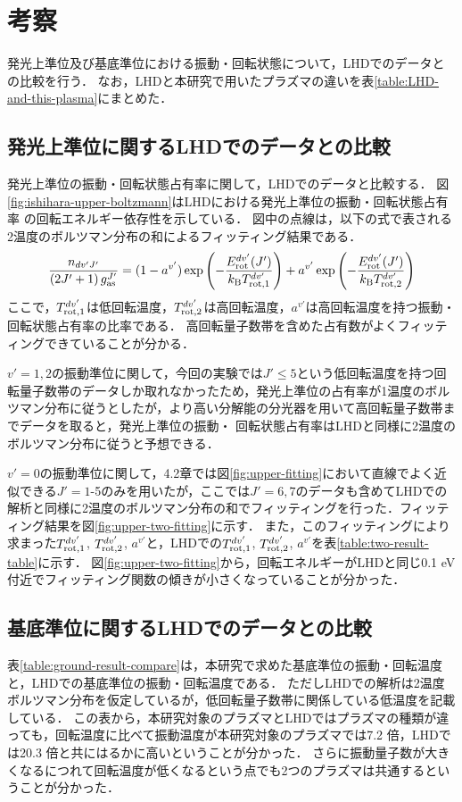 \chapter{考察}
発光上準位及び基底準位における振動・回転状態について，LHDでのデータとの比較を行う．
なお，LHDと本研究で用いたプラズマの違いを表\ref{table:LHD-and-this-plasma}にまとめた\cite{ishihara}．

\section{発光上準位に関するLHDでのデータとの比較}
発光上準位の振動・回転状態占有率に関して，LHDでのデータと比較する．
図\ref{fig:ishihara-upper-boltzmann}はLHDにおける発光上準位の振動・回転状態占有率
の回転エネルギー依存性を示している\cite{ishihara}．
図中の点線は，以下の式で表される2温度のボルツマン分布の和によるフィッティング結果である．
\begin{equation}
    \frac{n_{dv'J'}}{\left( 2J'+1 \right)g^{J'}_{\rm as}} = (1-a^{v'})\exp \left( - \frac{E^{dv'}_{\rm rot}(J')}{k_{\rm B} T^{dv'}_{\rm rot,1}} \right)+ a^{v'} \exp \left( - \frac{E^{dv'}_{\rm rot}(J')}{k_{\rm B} T^{dv'}_{\rm rot,2}} \right)
\end{equation}
ここで，$T^{dv'}_{\rm rot,1}$は低回転温度，$T^{dv'}_{\rm rot,2}$は高回転温度，$a^{v'}$は高回転温度を持つ振動・回転状態占有率の比率である．
高回転量子数帯を含めた占有数がよくフィッティングできていることが分かる．

$v'=1,2$の振動準位に関して，今回の実験では$J' \leq 5$という低回転温度を持つ回転量子数帯のデータしか取れなかったため，発光上準位の占有率が1温度のボルツマン分布に従うとしたが，より高い分解能の分光器を用いて高回転量子数帯までデータを取ると，発光上準位の振動・
回転状態占有率はLHDと同様に2温度のボルツマン分布に従うと予想できる．

$v'=0$の振動準位に関して，4.2章では図\ref{fig:upper-fitting}において直線でよく近似できる$J'=1$-5のみを用いたが，ここでは$J'=6,7$のデータも含めてLHDでの解析と同様に2温度のボルツマン分布の和でフィッティングを行った．フィッティング結果を図\ref{fig:upper-two-fitting}に示す．
また，このフィッティングにより求まった$T^{dv'}_{\rm rot,1}$, $T^{dv'}_{\rm rot,2}$, $a^{v'}$と，LHDでの$T^{dv'}_{\rm rot,1}$, $T^{dv'}_{\rm rot,2}$, $a^{v'}$を表\ref{table:two-result-table}に示す．
図\ref{fig:upper-two-fitting}から，回転エネルギーがLHDと同じ0.1 eV付近でフィッティング関数の傾きが小さくなっていることが分かった．

\section{基底準位に関するLHDでのデータとの比較}
表\ref{table:ground-result-compare}は，本研究で求めた基底準位の振動・回転温度と，LHDでの基底準位の振動・回転温度\cite{ishihara}である．
ただしLHDでの解析は2温度ボルツマン分布を仮定しているが，低回転量子数帯に関係している低温度を記載している．
この表から，本研究対象のプラズマとLHDではプラズマの種類が違っても，回転温度に比べて振動温度が本研究対象のプラズマでは7.2 倍，LHDでは20.3 倍と共にはるかに高いということが分かった．
さらに振動量子数が大きくなるにつれて回転温度が低くなるという点でも2つのプラズマは共通するということが分かった．